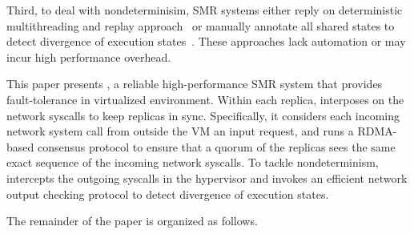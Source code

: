 Third, to deal with nondeterminisim, SMR systems either reply on deterministic multithreading and replay 
approach~\cite{rex:eurosys14} or manually annotate all shared states to detect divergence of execution 
states~\cite{eve:osdi12}. These approaches lack automation or may incur high performance overhead.

This paper presents \xxx, a reliable high-performance SMR system that provides fault-tolerance 
in virtualized environment. Within each replica, \xxx interposes on the network syscalls to keep 
replicas in sync. Specifically, it considers each incoming network system call from outside the VM 
an input request, and runs a RDMA-based \paxos consensus protocol to ensure that a quorum of the 
replicas sees the same exact sequence of the incoming network syscalls. To tackle nondeterminism, 
\xxx intercepts the outgoing syscalls in the hypervisor and invokes an efficient network output 
checking protocol to detect divergence of execution states.

The remainder of the paper is organized as follows.
